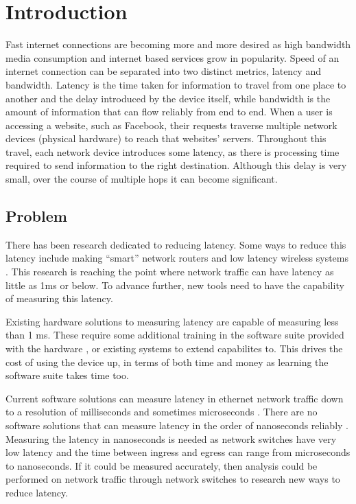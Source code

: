 \chapter{Introduction}\label{C:intro}

\par Fast internet connections are becoming more and more desired as high bandwidth media consumption and internet based services grow in popularity. 
Speed of an internet connection can be separated into two distinct metrics, latency and bandwidth. 
Latency is the time taken for information to travel from one place to another and the delay introduced by the device itself, while bandwidth is the amount of information that can flow reliably from end to end.
When a user is accessing a website, such as Facebook, their requests traverse multiple network devices
(physical hardware) to reach that websites’ servers. Throughout this travel, each network device
introduces some latency, as there is processing time required to send information to the right
destination. Although this delay is very small, over the course of multiple hops it can become
significant.

\section{Problem}

\par There has been research dedicated to reducing latency. Some ways to reduce this latency include making “smart” network routers \cite{smartrouters} and low latency wireless systems \cite{5g}. 
This research is reaching the point where network traffic can have latency as little as 1ms \cite{lessthan1ms} or below.
To advance further, new tools need to have the capability of measuring this latency.

\par Existing hardware solutions to measuring latency are capable of measuring less than 1 ms.
These require some additional training in the software suite provided with the hardware \cite{dagfeatures}, or existing systems to extend capabilites to.
This drives the cost of using the device up, in terms of both time and money as learning the software suite takes time too.

\par Current software solutions can measure latency in ethernet network traffic down to a resolution of
milliseconds and sometimes microseconds \cite{pingisbad}. There are no software solutions that can measure
latency in the order of nanoseconds reliably \cite{timeinlinux}. Measuring the latency in nanoseconds is needed as
network switches have very low latency and the time between ingress and egress can range from
microseconds to nanoseconds. If it could be measured accurately, then analysis could be performed
on network traffic through network switches to research new ways to reduce latency.

